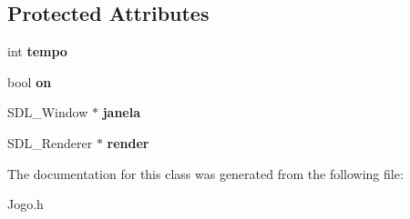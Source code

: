 \subsection*{Protected Attributes}
\begin{DoxyCompactItemize}
\item 
int {\bfseries tempo}\hypertarget{classJogo_a6bc04629fc18fa366e389ac71a7dce73}{}\label{classJogo_a6bc04629fc18fa366e389ac71a7dce73}

\item 
bool {\bfseries on}\hypertarget{classJogo_a4c51b441ab3dc99cd51333aa6599db65}{}\label{classJogo_a4c51b441ab3dc99cd51333aa6599db65}

\item 
S\+D\+L\+\_\+\+Window $\ast$ {\bfseries janela}\hypertarget{classJogo_afb8114c896f7d4f04abc403afa1c072a}{}\label{classJogo_afb8114c896f7d4f04abc403afa1c072a}

\item 
S\+D\+L\+\_\+\+Renderer $\ast$ {\bfseries render}\hypertarget{classJogo_a3f11734d77711c0907cbbf8bb1a8ecee}{}\label{classJogo_a3f11734d77711c0907cbbf8bb1a8ecee}

\end{DoxyCompactItemize}


The documentation for this class was generated from the following file\+:\begin{DoxyCompactItemize}
\item 
Jogo.\+h\end{DoxyCompactItemize}
